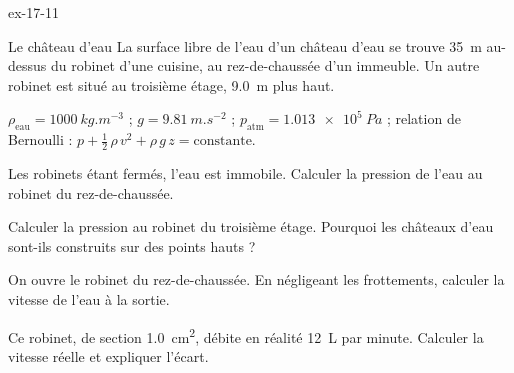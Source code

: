 \begin{blocLivre}{ex-17-11}
\begin{exercice}[2]{Le château d'eau}
La surface libre de l'eau d'un château d'eau se trouve \qty{35}{m} au-dessus du robinet d'une cuisine, au rez-de-chaussée
d'un immeuble. Un autre robinet est situé au troisième étage, \qty{9,0}{m} plus haut.
\begin{donnees}
$\rho_\mathrm{eau}=\qty{1000}{kg.m^{-3}}$ ; $g=\qty{9,81}{m.s^{-2}}$ ; $p_\mathrm{atm}=\qty{1,013e5}{Pa}$ ; relation de Bernoulli :
$p+\frac12\,\rho\,v^2+\rho\,g\,z=\text{constante}$.
\end{donnees}
\begin{questions}
\item Les robinets étant fermés, l'eau est immobile. Calculer la pression de l'eau au robinet du rez-de-chaussée.
\item Calculer la pression au robinet du troisième étage. Pourquoi les châteaux d'eau sont-ils construits sur des points
hauts ?
\item On ouvre le robinet du rez-de-chaussée. En négligeant les frottements, calculer la vitesse de l'eau à la sortie.
\item Ce robinet, de section \qty{1,0}{cm^2}, débite en réalité \qty{12}{L} par minute. Calculer la vitesse réelle et
expliquer l'écart.
\end{questions}
\end{exercice}
\end{blocLivre}
